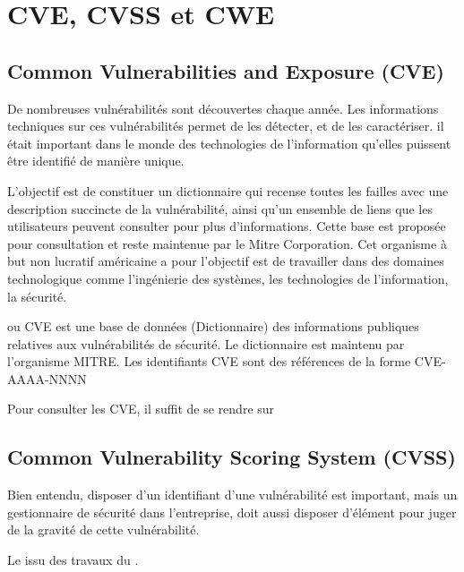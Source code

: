 
\section{CVE, CVSS et CWE}


\subsection{Common Vulnerabilities and Exposure (CVE)}

De nombreuses vulnérabilités sont découvertes chaque année. Les informations techniques sur ces vulnérabilités permet de les détecter, et de les caractériser. il était important dans le monde des technologies de l'information qu'elles puissent être identifié de manière unique.  

L’objectif est de constituer un dictionnaire qui recense toutes les failles avec une description succincte de la vulnérabilité, ainsi qu’un ensemble de liens que les utilisateurs peuvent consulter pour plus d’informations. Cette base  est proposée pour consultation et reste maintenue par le Mitre Corporation.  Cet organisme à but non lucratif américaine a pour  l'objectif est de travailler dans des domaines technologique comme l'ingénierie des systèmes, les technologies de l'information, la sécurité. 


 ou CVE est une base de données (Dictionnaire) des informations publiques relatives aux vulnérabilités de sécurité. Le dictionnaire est maintenu par l'organisme MITRE.  Les identifiants CVE sont des références de la forme CVE-AAAA-NNNN 
 
 Pour consulter les CVE,  il suffit de se rendre sur 


\subsection{Common Vulnerability Scoring System (CVSS)}

Bien entendu, disposer d'un identifiant d'une vulnérabilité est important, mais  un gestionnaire de sécurité dans l'entreprise, doit aussi disposer d'élément pour juger de la gravité de cette vulnérabilité. 

Le   issu des travaux du  .

